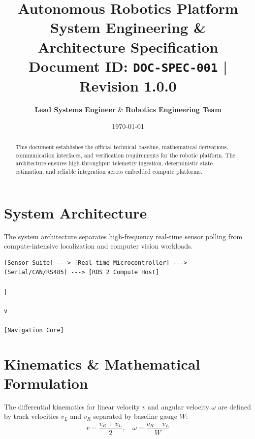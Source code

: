 \documentclass[11pt,a4paper]{article}
\title{
    \vspace{-1.2cm}
    \textbf{\huge \color{primaryblue} Autonomous Robotics Platform} \\
    \vspace{0.2cm}
    \Large \textbf{System Engineering \& Architecture Specification} \\
    \vspace{0.15cm}
    \normalsize Document ID: \texttt{DOC-SPEC-001} \quad | \quad Revision 1.0.0
}
\author{\textbf{Lead Systems Engineer} \quad \& \quad \textbf{Robotics Engineering Team}}
\date{\today}
\begin{document}
\maketitle
\thispagestyle{fancy}

\begin{abstract}
\noindent This document establishes the official technical baseline, mathematical derivations, communication interfaces, and verification requirements for the robotic platform. The architecture ensures high-throughput telemetry ingestion, deterministic state estimation, and reliable integration across embedded compute platforms.
\end{abstract}

\vspace{-0.2cm}
\tableofcontents
\vspace{0.3cm}

\section{System Architecture}
The system architecture separates high-frequency real-time sensor polling from compute-intensive localization and computer vision workloads.

\begin{center}
\begin{lstlisting}[language={}, numbers=none, basicstyle=\ttfamily\tiny\color{darkgray}]
 [Sensor Suite] ---> [Real-time Microcontroller] ---> (Serial/CAN/RS485) ---> [ROS 2 Compute Host]
                                                                                     |
                                                                                     v
                                                                             [Navigation Core]
\end{lstlisting}
\vspace{-4pt}
\end{center}

\section{Kinematics \& Mathematical Formulation}
The differential kinematics for linear velocity $v$ and angular velocity $\omega$ are defined by track velocities $v_L$ and $v_R$ separated by baseline gauge $W$:
\begin{equation}
v = \frac{v_R + v_L}{2}, \quad \omega = \frac{v_R - v_L}{W}
\end{equation}
\end{document}
